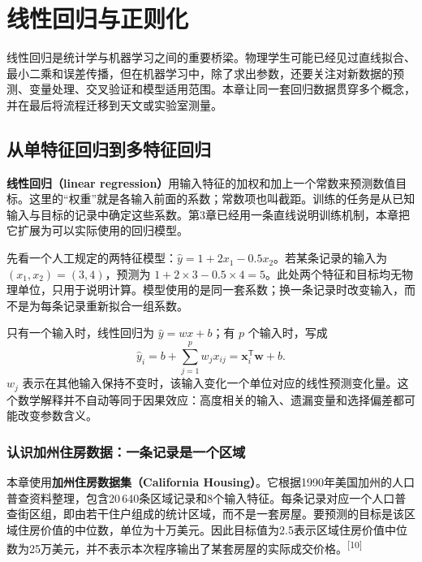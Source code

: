 \chapter{线性回归与正则化}

线性回归是统计学与机器学习之间的重要桥梁。物理学生可能已经见过直线拟合、最小二乘和误差传播，但在机器学习中，除了求出参数，还要关注对新数据的预测、变量处理、交叉验证和模型适用范围。本章让同一套回归数据贯穿多个概念，并在最后将流程迁移到天文或实验室测量。
\section{从单特征回归到多特征回归}

\label{sec:housing-intro}
\textbf{线性回归（linear regression）}用输入特征的加权和加上一个常数来预测数值目标。这里的“权重”就是各输入前面的系数；常数项也叫截距。训练的任务是从已知输入与目标的记录中确定这些系数。第3章已经用一条直线说明训练机制，本章把它扩展为可以实际使用的回归模型。

先看一个人工规定的两特征模型：$\hat y=1+2x_1-0.5x_2$。若某条记录的输入为 $(x_1,x_2)=(3,4)$，预测为 $1+2\times3-0.5\times4=5$。此处两个特征和目标均无物理单位，只用于说明计算。模型使用的是同一套系数；换一条记录时改变输入，而不是为每条记录重新拟合一组系数。

只有一个输入时，线性回归为 $\hat y=wx+b$；有 $p$ 个输入时，写成
\begin{equation}
\hat y_i=b+\sum_{j=1}^{p}w_jx_{ij}=\mathbf x_i^{\mathsf T}\mathbf w+b.
\end{equation}
$w_j$ 表示在其他输入保持不变时，该输入变化一个单位对应的线性预测变化量。这个数学解释并不自动等同于因果效应：高度相关的输入、遗漏变量和选择偏差都可能改变参数含义。

\subsection*{认识加州住房数据：一条记录是一个区域}
本章使用\textbf{加州住房数据集（California Housing）}。它根据1990年美国加州的人口普查资料整理，包含20\,640条区域记录和8个输入特征。每条记录对应一个人口普查街区组，即由若干住户组成的统计区域，而不是一套房屋。要预测的目标是该区域住房价值的中位数，单位为十万美元。因此目标值为2.5表示区域住房价值中位数为25万美元，并不表示本次程序输出了某套房屋的实际成交价格。\textsuperscript{[10]}

